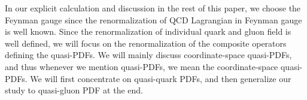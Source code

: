 In our explicit calculation and discussion in the rest of this paper, we choose the Feynman gauge since the renormalization of QCD Lagrangian in Feynman gauge is well known.  Since the renormalization of individual quark and gluon field is well defined, we will focus on the renormalization of the composite operators defining the quasi-PDFs.  We will mainly discuss coordinate-space quasi-PDFs, and thus whenever we mention quasi-PDFs,  we mean the coordinate-space quasi-PDFs.  We will first concentrate on quasi-quark PDFs, and then generalize our study to quasi-gluon PDF at the end.
